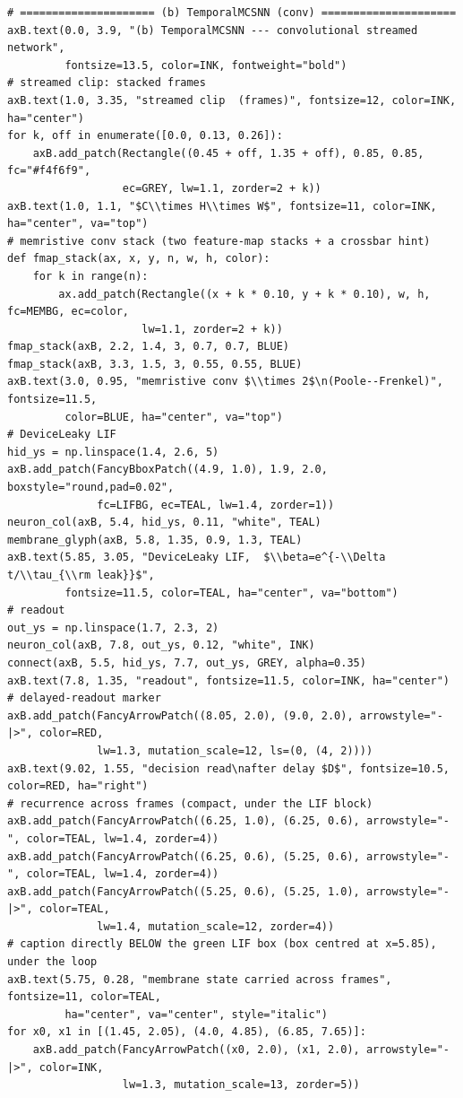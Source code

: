 \begin{lstlisting}[caption={experiments/temporal\_storerecall.ipynb},label={lst:mnn-nb-temporal-storerecall}]
# ===================== (b) TemporalMCSNN (conv) =====================
axB.text(0.0, 3.9, "(b) TemporalMCSNN --- convolutional streamed network",
         fontsize=13.5, color=INK, fontweight="bold")
# streamed clip: stacked frames
axB.text(1.0, 3.35, "streamed clip  (frames)", fontsize=12, color=INK, ha="center")
for k, off in enumerate([0.0, 0.13, 0.26]):
    axB.add_patch(Rectangle((0.45 + off, 1.35 + off), 0.85, 0.85, fc="#f4f6f9",
                  ec=GREY, lw=1.1, zorder=2 + k))
axB.text(1.0, 1.1, "$C\\times H\\times W$", fontsize=11, color=INK, ha="center", va="top")
# memristive conv stack (two feature-map stacks + a crossbar hint)
def fmap_stack(ax, x, y, n, w, h, color):
    for k in range(n):
        ax.add_patch(Rectangle((x + k * 0.10, y + k * 0.10), w, h, fc=MEMBG, ec=color,
                     lw=1.1, zorder=2 + k))
fmap_stack(axB, 2.2, 1.4, 3, 0.7, 0.7, BLUE)
fmap_stack(axB, 3.3, 1.5, 3, 0.55, 0.55, BLUE)
axB.text(3.0, 0.95, "memristive conv $\\times 2$\n(Poole--Frenkel)", fontsize=11.5,
         color=BLUE, ha="center", va="top")
# DeviceLeaky LIF
hid_ys = np.linspace(1.4, 2.6, 5)
axB.add_patch(FancyBboxPatch((4.9, 1.0), 1.9, 2.0, boxstyle="round,pad=0.02",
              fc=LIFBG, ec=TEAL, lw=1.4, zorder=1))
neuron_col(axB, 5.4, hid_ys, 0.11, "white", TEAL)
membrane_glyph(axB, 5.8, 1.35, 0.9, 1.3, TEAL)
axB.text(5.85, 3.05, "DeviceLeaky LIF,  $\\beta=e^{-\\Delta t/\\tau_{\\rm leak}}$",
         fontsize=11.5, color=TEAL, ha="center", va="bottom")
# readout
out_ys = np.linspace(1.7, 2.3, 2)
neuron_col(axB, 7.8, out_ys, 0.12, "white", INK)
connect(axB, 5.5, hid_ys, 7.7, out_ys, GREY, alpha=0.35)
axB.text(7.8, 1.35, "readout", fontsize=11.5, color=INK, ha="center")
# delayed-readout marker
axB.add_patch(FancyArrowPatch((8.05, 2.0), (9.0, 2.0), arrowstyle="-|>", color=RED,
              lw=1.3, mutation_scale=12, ls=(0, (4, 2))))
axB.text(9.02, 1.55, "decision read\nafter delay $D$", fontsize=10.5, color=RED, ha="right")
# recurrence across frames (compact, under the LIF block)
axB.add_patch(FancyArrowPatch((6.25, 1.0), (6.25, 0.6), arrowstyle="-", color=TEAL, lw=1.4, zorder=4))
axB.add_patch(FancyArrowPatch((6.25, 0.6), (5.25, 0.6), arrowstyle="-", color=TEAL, lw=1.4, zorder=4))
axB.add_patch(FancyArrowPatch((5.25, 0.6), (5.25, 1.0), arrowstyle="-|>", color=TEAL,
              lw=1.4, mutation_scale=12, zorder=4))
# caption directly BELOW the green LIF box (box centred at x=5.85), under the loop
axB.text(5.75, 0.28, "membrane state carried across frames", fontsize=11, color=TEAL,
         ha="center", va="center", style="italic")
for x0, x1 in [(1.45, 2.05), (4.0, 4.85), (6.85, 7.65)]:
    axB.add_patch(FancyArrowPatch((x0, 2.0), (x1, 2.0), arrowstyle="-|>", color=INK,
                  lw=1.3, mutation_scale=13, zorder=5))


\end{lstlisting}
